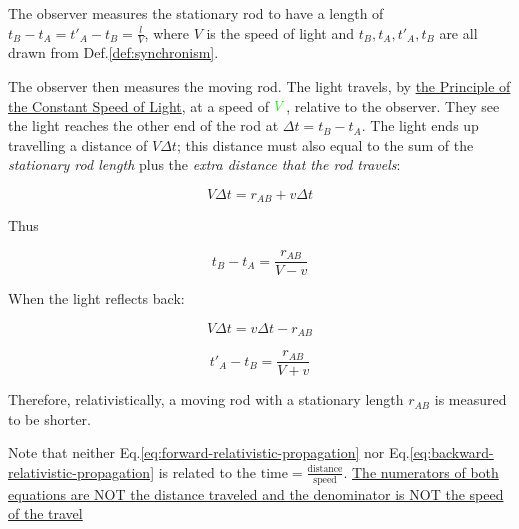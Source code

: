 \begin{tcolorbox}
    The observer measures the stationary rod to have a length of $t_B - t_A = t'_A - t_B = \frac{l}{V}$, where $V$ is
    the speed of light and $t_B, t_A, t'_A, t_B$ are all drawn from Def.\ref{def:synchronism}.

    The observer then measures the moving rod. The light travels, by
    \hyperlink{constant-c-principle}{the Principle of the Constant Speed of Light}, at a speed of $ \color{green} V$,
    relative to the observer. They see the light reaches the other end of the rod at $\Delta t = t_B - t_A$. The
    light ends up travelling a distance of $V\Delta t$; this distance must also equal to the sum of the
    \textit{stationary rod length} plus the \textit{extra distance that the rod travels}:

    \begin{equation}
        V\Delta t = r_{AB} + v\Delta t
    \end{equation}

    Thus

    \begin{equation}\label{eq:forward-relativistic-propagation}
        t_B - t_A = \frac{r_{AB}}{V - v}
    \end{equation}

    When the light reflects back:

    \begin{equation}
        V\Delta t = v\Delta t - r_{AB}
    \end{equation}

    \begin{equation}\label{eq:backward-relativistic-propagation}
        t'_A - t_B = \frac{r_{AB}}{V + v}
    \end{equation}

    Therefore, relativistically, a moving rod with a stationary length $r_{AB}$ is measured to be shorter.

\end{tcolorbox}

Note that neither Eq.\ref{eq:forward-relativistic-propagation} nor Eq.\ref{eq:backward-relativistic-propagation} is
related to the $\text{time} = \frac{\text{distance}}{\text{speed}}$. \href{https://qr.ae/psQeNd}{The numerators of
both equations are NOT the distance traveled and the denominator is NOT the speed of the travel}

